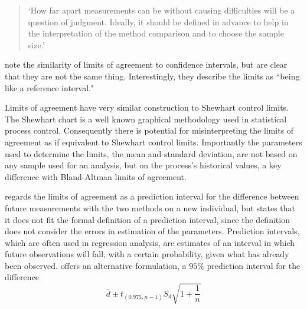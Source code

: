 \documentclass[12pt, a4paper]{report}
\theoremstyle{plain}
\theoremstyle{definition}
\theoremstyle{remark}
\begin{document}
\begin{quote}
	`How far apart measurements can be without causing difficulties
	will be a question of judgment. Ideally, it should be defined in
	advance to help in the interpretation of the method comparison and
	to choose the sample size.'\citep{BA86}
\end{quote}

\citet{BA99} note the similarity of limits of agreement to
confidence intervals, but are clear that they are not the same
thing. Interestingly, they describe the limits as ``being like a
reference interval."

Limits of agreement have very similar construction to Shewhart
control limits. The Shewhart chart is a well known graphical
methodology used in statistical process control. Consequently
there is potential for misinterpreting the limits of agreement as
if equivalent to Shewhart control limits. Importantly the
parameters used to determine the limits, the mean and standard
deviation, are not based on any sample used for an analysis, but
on the process's historical values, a key difference with
Bland-Altman limits of agreement.

\citet{BXC2008} regards the limits of agreement as a prediction
interval for the difference between future measurements with the
two methods on a new individual, but states that it does not fit
the formal definition of a prediction interval, since the
definition does not consider the errors in estimation of the
parameters. Prediction intervals, which are often used in
regression analysis, are estimates of an interval in which future
observations will fall, with a certain probability, given what has
already been observed. \citet{BXC2008} offers an alternative
formulation, a $95\%$ prediction interval for the difference
\begin{equation}
	\bar{d} \pm t_{(0.975, n-1)}S_{d} \sqrt{1+\frac{1}{n}}
\end{equation}
\end{document}
